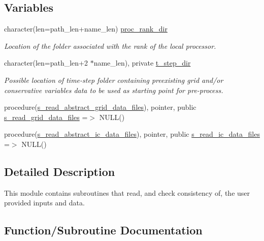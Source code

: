 \subsection*{Variables}
\begin{DoxyCompactItemize}
\item 
character(len=path\+\_\+len+name\+\_\+len) \hyperlink{namespacem__start__up_a15a1dec84d62ebf0216c78f9cbdd3d73}{proc\+\_\+rank\+\_\+dir}
\begin{DoxyCompactList}\small\item\em Location of the folder associated with the rank of the local processor. \end{DoxyCompactList}\item 
character(len=path\+\_\+len+2 $\ast$name\+\_\+len), private \hyperlink{namespacem__start__up_aa4d95a815bb7fb67f4717f93e906e605}{t\+\_\+step\+\_\+dir}
\begin{DoxyCompactList}\small\item\em Possible location of time-\/step folder containing preexisting grid and/or conservative variables data to be used as starting point for pre-\/process. \end{DoxyCompactList}\item 
procedure(\hyperlink{interfacem__start__up_1_1s__read__abstract__grid__data__files}{s\+\_\+read\+\_\+abstract\+\_\+grid\+\_\+data\+\_\+files}), pointer, public \hyperlink{namespacem__start__up_af646e0769cd88c45b2acfc47a3b15d7b}{s\+\_\+read\+\_\+grid\+\_\+data\+\_\+files} =$>$ N\+U\+LL()
\item 
procedure(\hyperlink{interfacem__start__up_1_1s__read__abstract__ic__data__files}{s\+\_\+read\+\_\+abstract\+\_\+ic\+\_\+data\+\_\+files}), pointer, public \hyperlink{namespacem__start__up_a7a35339ce3c84eaf721a80e77be63c07}{s\+\_\+read\+\_\+ic\+\_\+data\+\_\+files} =$>$ N\+U\+LL()
\end{DoxyCompactItemize}


\subsection{Detailed Description}
This module contains subroutines that read, and check consistency of, the user provided inputs and data. 

\subsection{Function/\+Subroutine Documentation}
\mbox{\label{namespacem__start__up_a2c3f4c2fe04814a924bff26228516a39}} 
